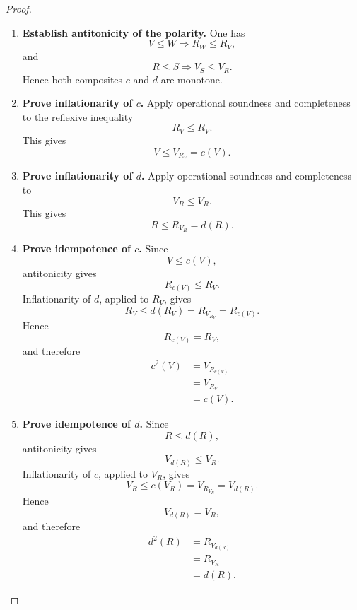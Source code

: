 \begin{proof}
    \leavevmode
    \begin{enumerate}
        \item \textbf{Establish antitonicity of the polarity.}
        One has
        \[
            V\leq W
            \Longrightarrow
            R_W\leq R_V,
        \]
        and
        \[
            R\leq S
            \Longrightarrow
            V_S\leq V_R.
        \]
        Hence both composites \(c\) and \(d\) are monotone.

        \item \textbf{Prove inflationarity of \(c\).}
        Apply operational soundness and completeness to the reflexive
        inequality
        \[
            R_V\leq R_V.
        \]
        This gives
        \[
            V\leq V_{R_V}=c(V).
        \]

        \item \textbf{Prove inflationarity of \(d\).}
        Apply operational soundness and completeness to
        \[
            V_R\leq V_R.
        \]
        This gives
        \[
            R\leq R_{V_R}=d(R).
        \]

        \item \textbf{Prove idempotence of \(c\).}
        Since
        \[
            V\leq c(V),
        \]
        antitonicity gives
        \[
            R_{c(V)}\leq R_V.
        \]
        Inflationarity of \(d\), applied to \(R_V\), gives
        \[
            R_V
            \leq
            d(R_V)
            =
            R_{V_{R_V}}
            =
            R_{c(V)}.
        \]
        Hence
        \[
            R_{c(V)}=R_V,
        \]
        and therefore
        \[
        \begin{aligned}
            c^2(V)
            &=
            V_{R_{c(V)}}
            \\
            &=
            V_{R_V}
            \\
            &=
            c(V).
        \end{aligned}
        \]

        \item \textbf{Prove idempotence of \(d\).}
        Since
        \[
            R\leq d(R),
        \]
        antitonicity gives
        \[
            V_{d(R)}\leq V_R.
        \]
        Inflationarity of \(c\), applied to \(V_R\), gives
        \[
            V_R
            \leq
            c(V_R)
            =
            V_{R_{V_R}}
            =
            V_{d(R)}.
        \]
        Hence
        \[
            V_{d(R)}=V_R,
        \]
        and therefore
        \[
        \begin{aligned}
            d^2(R)
            &=
            R_{V_{d(R)}}
            \\
            &=
            R_{V_R}
            \\
            &=
            d(R).
        \end{aligned}
        \]
    \end{enumerate}
\end{proof}

